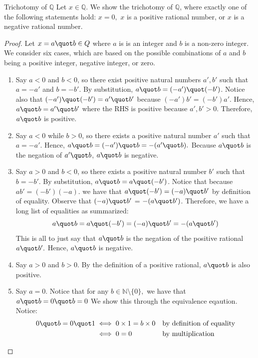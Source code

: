 \break
\begin{problem}{Trichotomy of $\mathbb{Q}$}
    Let $x \in \mathbb{Q}.$ We show the trichotomy of $\mathbb{Q}$, where exactly one of the following statements hold:
    $x = 0,$ $x$ is a positive rational number, or $x$ is a negative rational number.
\end{problem}
\begin{proof}
    Let $x = a \quot b \in Q$ where $a$ is is an integer and $b$ is a non-zero integer.
    We consider six cases, which are based on the possible combinations of $a$ and $b$ being a positive integer, negative integer, or zero.
    \begin{enumerate}
        \item Say $a < 0$ and $b < 0$, so there exist positive natural numbers $a', b'$ such that $a = -a'$ and $b = -b'$.
        By substitution, $a \quot b = (-a') \quot (-b')$.
        Notice also that $(-a') \quot (-b') = a' \quot b'$ because $(-a')b'=(-b')a'$. 
        Hence, $a \quot b = a' \quot b'$ where the RHS is positive because $a', b' > 0$.  
        Therefore, $a \quot b$ is positive.

        \item Say $a < 0$ while $b > 0$, so there exists a positive natural number $a'$ such that $a = -a'.$
        Hence, $a \quot b = (-a') \quot b = -(a' \quot b).$ 
        Because $a \quot b$ is the negation of $a' \quot b$, $a \quot b$ is negative.
        
        \item Say $a > 0$ and $b < 0$, so there exists a positive natural number $b'$ such that $b = -b'.$ 
        By substitution, $a \quot b = a \quot (-b')$.
        Notice that because $ab' = (-b')(-a)$. we have that $a \quot (-b') = (-a) \quot b'$ by definition of equality.
        Observe that $(-a) \quot b'$ = $-(a \quot b')$.
        Therefore, we have a long list of equalities as summarized: 
        $$a \quot b = a \quot (-b') = (-a) \quot b' = -(a\quot b')$$ 
        This is all to just say that $a \quot b$ is the negation of the positive rational $a \quot b'.$
        Hence, $a \quot b$ is negative.

        \item Say $a > 0$ and $b > 0.$ 
        By the definition of a positive rational, $a \quot b$ is also positive.

        \item Say $a = 0$. 
        Notice that for any $b \in \mathbb{N} \setminus \{0\},$ we have that $a \quot b = 0 \quot b = 0$
        We show this through the equivalence eqaution.
        Notice: 
        \begin{align*}
            0 \quot b = 0 \quot 1 &\iff 0 \times 1 = b \times 0 && \text{by definition of equality} \\
            &\iff 0 = 0 &&\text{by multiplication}
        \end{align*}
    \end{enumerate}


\end{proof}
